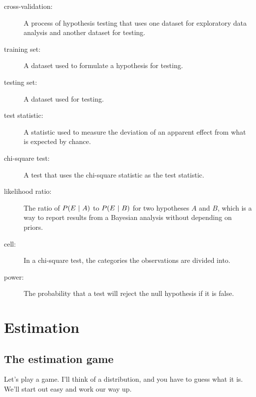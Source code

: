 \documentclass[12pt]{book}
\begin{document}
\begin{description}
\item[cross-validation:] A process of hypothesis testing that uses one
dataset for exploratory data analysis and another dataset for testing.

\item[training set:] A dataset used to formulate a hypothesis for testing.

\item[testing set:] A dataset used for testing.

\item[test statistic:] A statistic used to measure the deviation of an
apparent effect from what is expected by chance.

\item[chi-square test:] A test that uses the chi-square statistic as
the test statistic.

\item[likelihood ratio:] The ratio of $P(E ~|~ A)$ to $P(E ~|~ B)$ for two
hypotheses $A$ and $B$, which is a way to report
results from a Bayesian analysis without depending on priors.

\item[cell:] In a chi-square test, the categories the observations are
divided into.

\item[power:] The probability that a test will reject the null hypothesis
if it is false.

\end{description}



\chapter{Estimation}
\label{estimation}

\section{The estimation game}

Let's play a game.  I'll think of a distribution, and you have to guess
what it is.  We'll start out easy and work our way up.

\end{document}
